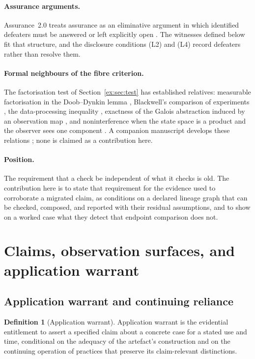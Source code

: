 \documentclass[11pt]{article}
\theoremstyle{definition}
\newtheorem{definition}{Definition}[section]
\begin{document}
\paragraph{Assurance arguments.} Assurance~2.0 treats assurance as an eliminative argument in which identified defeaters must be answered or left explicitly open \citep{bloomfieldrushby2021,bloomfieldnetkachovarushby2024}. The witnesses defined below fit that structure, and the disclosure conditions (L2) and (L4) record defeaters rather than resolve them.

\paragraph{Formal neighbours of the fibre criterion.} The factorisation test of Section~\ref{ex:sec:test} has established relatives: measurable factorisation in the Doob--Dynkin lemma \citep[Lemma~1.13]{kallenberg2002}, Blackwell's comparison of experiments \citep{blackwell1953}, the data-processing inequality \citep{coverthomas2006}, exactness of the Galois abstraction induced by an observation map \citep{cousot1977}, and noninterference when the state space is a product and the observer sees one component \citep{goguenmeseguer1982}. A companion manuscript develops these relations \citep{moore2026exactness}; none is claimed as a contribution here.

\paragraph{Position.} The requirement that a check be independent of what it checks is old. The contribution here is to state that requirement for the evidence used to corroborate a migrated claim, as conditions on a declared lineage graph that can be checked, composed, and reported with their residual assumptions, and to show on a worked case what they detect that endpoint comparison does not.

\section{Claims, observation surfaces, and application warrant}\label{ex:sec:static}

\subsection{Application warrant and continuing reliance}\label{ex:sec:warrant}

\begin{definition}[Application warrant]\label{ex:def:warrant}
Application warrant is the evidential entitlement to assert a specified claim about a concrete case for a stated use and time, conditional on the adequacy of the artefact's construction and on the continuing operation of practices that preserve its claim-relevant distinctions.
\end{definition}
\end{document}
